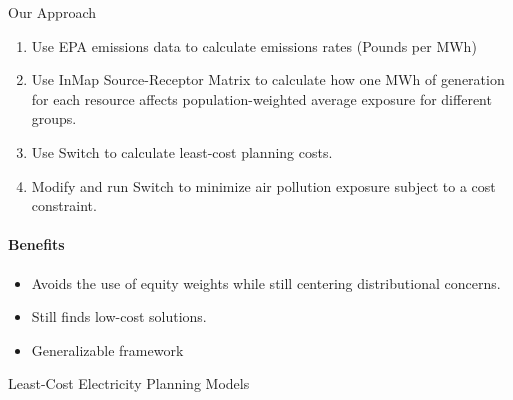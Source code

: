 \documentclass{beamer}
\begin{document}
\begin{frame}{Our Approach}
    \begin{enumerate}
        \item Use EPA emissions data to calculate emissions rates (Pounds per MWh)
        \item Use InMap Source-Receptor Matrix to calculate how one MWh of generation for each resource affects population-weighted average exposure for different groups.
        \item Use Switch to calculate least-cost planning costs.
        \item Modify and run Switch to minimize air pollution exposure subject to a cost constraint.
    \end{enumerate}

\paragraph{Benefits}
\begin{itemize}
    \item Avoids the use of equity weights while still centering distributional concerns.
    \item Still finds low-cost solutions.
    \item Generalizable framework
\end{itemize}
\end{frame}

\begin{frame}{Least-Cost Electricity Planning Models}
\begin{center}
\end{center}
\end{frame}
\end{document}
